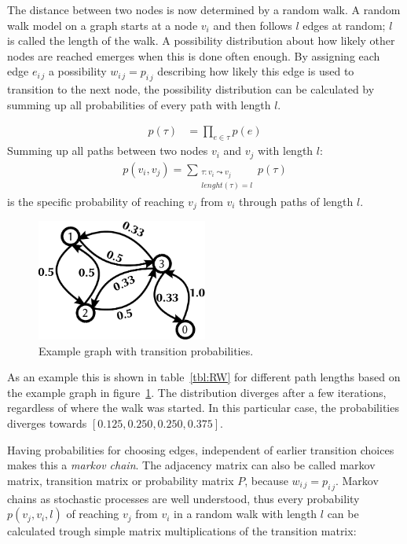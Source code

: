 The distance between two nodes is now determined by a random walk. A random walk model on a graph starts at a node $v_i$ and then follows $l$ edges at random; $l$ is called the length of the walk. A possibility distribution about how likely other nodes are reached emerges when this is done often enough. By assigning each edge $e_{i\,j}$ a possibility $w_{i\,j} = p_{i\,j}$ describing how likely this edge is used to transition to the next node, the possibility distribution can be calculated by summing up all probabilities of every path with length $l$.

\begin{align}
p(\tau) &= \prod_{e \in \tau} p(e)
\end{align}
%
Summing up all paths between two nodes $v_i$ and $v_j$ with length $l$:
\begin{align}
p(v_i, v_j)=\sum_{\substack{\tau: v_i \leadsto v_j\\lenght(\tau) = l}} p(\tau)
\end{align}
%
is the specific probability of reaching $v_j$ from $v_i$ through paths of length $l$.


\begin{figure}%
		\centering
		\includegraphics[width=0.5\textwidth]{pix/transition_ex.pdf}
		\caption[Graph with transition probabilities.]{Example graph with transition probabilities.}
		\label{fig:graph_for_examples}
\end{figure}

As an example this is shown in table~\ref{tbl:RW} for different path lengths based on the example graph in figure~\ref{fig:graph_for_examples}. The distribution diverges after a few iterations, regardless of where the walk was started. In this particular case, the probabilities diverges towards $[0.125, 0.250, 0.250, 0.375]$.

Having probabilities for choosing edges, independent of earlier transition choices makes this a \emph{markov chain}\cite{Aldous2002}. The adjacency matrix can also be called markov matrix, transition matrix or probability matrix $P$, because $w_{i\,j} = p_{i\,j}$. Markov chains as stochastic processes are well understood, thus every probability $p(v_j, v_i, l)$ of reaching $v_j$ from $v_i$ in a random walk with length $l$ can be calculated trough simple matrix multiplications of the transition matrix:

